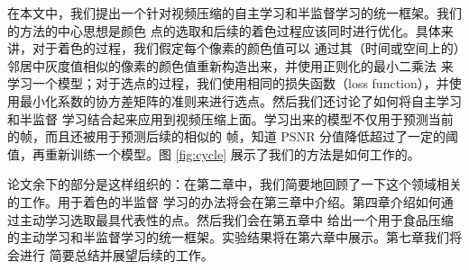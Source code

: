 在本文中，我们提出一个针对视频压缩的自主学习和半监督学习的统一框架。我们的方法的中心思想是颜色
点的选取和后续的着色过程应该同时进行优化。具体来讲，对于着色的过程，我们假定每个像素的颜色值可以
通过其（时间或空间上的）邻居中灰度值相似的像素的颜色值重新构造出来，并使用正则化的最小二乘法
来学习一个模型；对于选点的过程，我们使用相同的损失函数（loss
function），并使用最小化系数的协方差矩阵的准则来进行选点。然后我们还讨论了如何将自主学习和半监督
学习结合起来应用到视频压缩上面。学习出来的模型不仅用于预测当前的帧，而且还被用于预测后续的相似的
帧，知道 PSNR 分值降低超过了一定的阈值，再重新训练一个模型。图
\ref{fig:cycle} 展示了我们的方法是如何工作的。

论文余下的部分是这样组织的：在第二章中，我们简要地回顾了一下这个领域相关的工作。用于着色的半监督
学习的办法将会在第三章中介绍。第四章介绍如何通过主动学习选取最具代表性的点。然后我们会在第五章中
给出一个用于食品压缩的主动学习和半监督学习的统一框架。实验结果将在第六章中展示。第七章我们将会进行
简要总结并展望后续的工作。

